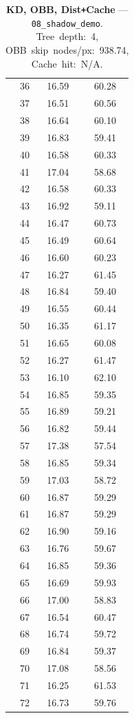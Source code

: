 \begin{table}[htbp]
\begin{tabular}{@{}rcc@{}}
    36 & 16.59 & 60.28 \\
    37 & 16.51 & 60.56 \\
    38 & 16.64 & 60.10 \\
    39 & 16.83 & 59.41 \\
    40 & 16.58 & 60.33 \\
    41 & 17.04 & 58.68 \\
    42 & 16.58 & 60.33 \\
    43 & 16.92 & 59.11 \\
    44 & 16.47 & 60.73 \\
    45 & 16.49 & 60.64 \\
    46 & 16.60 & 60.23 \\
    47 & 16.27 & 61.45 \\
    48 & 16.84 & 59.40 \\
    49 & 16.55 & 60.44 \\
    50 & 16.35 & 61.17 \\
    51 & 16.65 & 60.08 \\
    52 & 16.27 & 61.47 \\
    53 & 16.10 & 62.10 \\
    54 & 16.85 & 59.35 \\
    55 & 16.89 & 59.21 \\
    56 & 16.82 & 59.44 \\
    57 & 17.38 & 57.54 \\
    58 & 16.85 & 59.34 \\
    59 & 17.03 & 58.72 \\
    60 & 16.87 & 59.29 \\
    61 & 16.87 & 59.29 \\
    62 & 16.90 & 59.16 \\
    63 & 16.76 & 59.67 \\
    64 & 16.85 & 59.36 \\
    65 & 16.69 & 59.93 \\
    66 & 17.00 & 58.83 \\
    67 & 16.54 & 60.47 \\
    68 & 16.74 & 59.72 \\
    69 & 16.84 & 59.37 \\
    70 & 17.08 & 58.56 \\
    71 & 16.25 & 61.53 \\
    72 & 16.73 & 59.76 \\
    \bottomrule
  \end{tabular}
  \caption{\textbf{KD, OBB, Dist\texttt{+}Cache} --- \texttt{08\_shadow\_demo}. Tree~depth:~4, OBB~skip~nodes/px:~938.74, Cache~hit:~N/A.}
  \label{tab:rt-08-shadow-demo-KD-OBB-DistCache}
\end{table}

